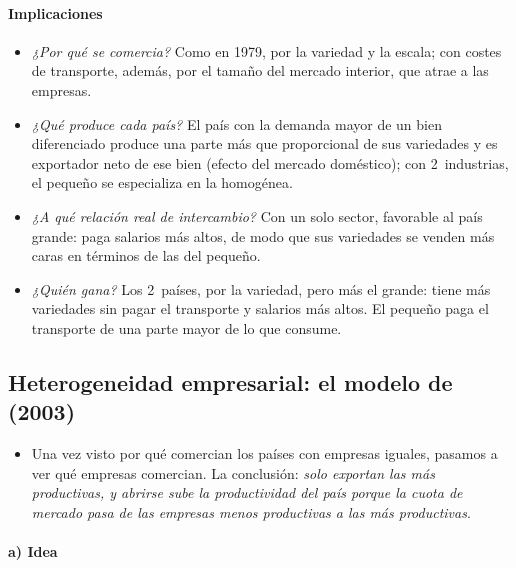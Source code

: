 \documentclass[11pt]{article}
\begin{document}
\paragraph{Implicaciones}

\begin{itemize}
\item \emph{¿Por qué se comercia?} Como en 1979, por la variedad y la escala; con costes de transporte, además, por el tamaño del mercado interior, que atrae a las empresas.
\item \emph{¿Qué produce cada país?} El país con la demanda mayor de un bien diferenciado produce una parte más que proporcional de sus variedades y es exportador neto de ese bien (efecto del mercado doméstico); con 2~industrias, el pequeño se especializa en la homogénea.
\item \emph{¿A qué relación real de intercambio?} Con un solo sector, favorable al país grande: paga salarios más altos, de modo que sus variedades se venden más caras en términos de las del pequeño.
\item \emph{¿Quién gana?} Los 2~países, por la variedad, pero más el grande: tiene más variedades sin pagar el transporte y salarios más altos. El pequeño paga el transporte de una parte mayor de lo que consume.
\end{itemize}

\subsection{Heterogeneidad empresarial: el modelo de  (2003)}\label{sec:melitz}

\begin{itemize}
\item Una vez visto por qué comercian los países con empresas iguales, pasamos a ver qué empresas comercian. La conclusión: \emph{solo exportan las más productivas, y abrirse sube la productividad del país porque la cuota de mercado pasa de las empresas menos productivas a las más productivas}.
\end{itemize}

\paragraph{a) Idea}
\end{document}
